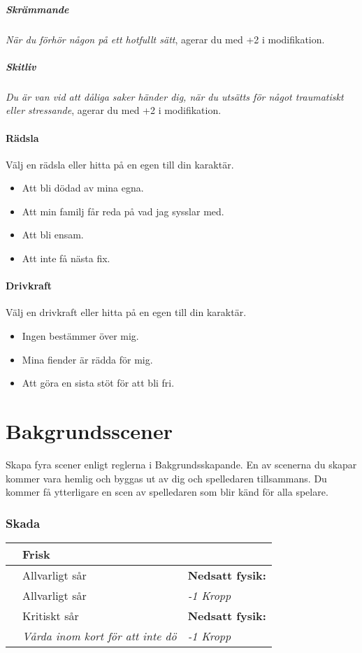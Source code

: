 \subsubsection{Skrämmande}
\textit{När du förhör någon på ett hotfullt sätt}, agerar du med +2 i modifikation.
\subsubsection{Skitliv}
\textit{Du är van vid att dåliga saker händer dig, när du utsätts för något traumatiskt eller stressande}, agerar du med +2 i modifikation.
\subsection{Rädsla}
Välj en rädsla eller hitta på en egen till din karaktär.
\begin{itemize}
  \item Att bli dödad av mina egna.
  \item Att min familj får reda på vad jag sysslar med.
  \item Att bli ensam.
  \item Att inte få nästa fix.
\end{itemize}
\subsection{Drivkraft}
Välj en drivkraft eller hitta på en egen till din karaktär.
\begin{itemize}
  \item Ingen bestämmer över mig.
  \item Mina fiender är rädda för mig.
  \item Att göra en sista stöt för att bli fri.
\end{itemize}
\clearpage
\part{Bakgrundsscener}
Skapa fyra scener enligt reglerna i Bakgrundsskapande. En av scenerna du skapar kommer vara hemlig och byggas ut av dig och spelledaren tillsammans. Du kommer få ytterligare en scen av spelledaren som blir känd för alla spelare.


\clearpage
\section*{Skada}
\begin{table}[!h]
\begin{tabular}{|c| l l|}
\hline & Frisk & \\
\hline & Allvarligt sår & \textbf{Nedsatt fysik:} \\
& Allvarligt sår &  \textit{-1 Kropp} \\
\hline & Kritiskt sår &  \textbf{Nedsatt fysik:} \\
& \textit{Vårda inom kort för att inte dö} & \textit{-1 Kropp} \\
\hline
\end{tabular}
\end{table}

